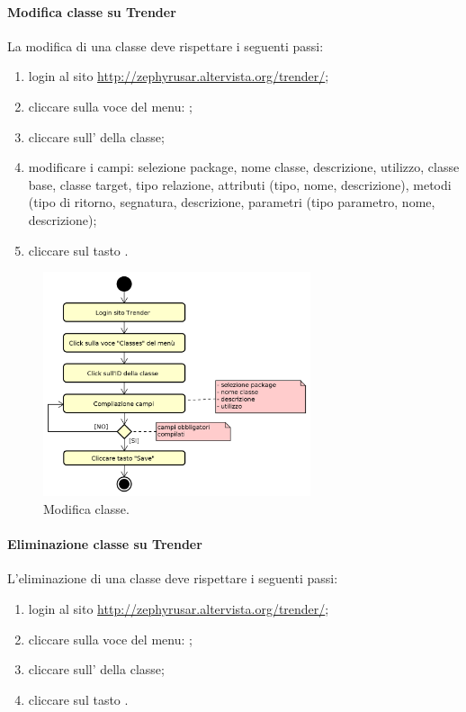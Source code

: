 		\paragraph{Modifica classe su Trender}
		La modifica di una classe deve rispettare i seguenti passi:
		\begin{enumerate}
			\item login al sito \url{http://zephyrusar.altervista.org/trender/};
			\item cliccare sulla voce del menu: ;
			\item cliccare sull' della classe;	
			\item modificare i campi: selezione package, nome classe, descrizione, utilizzo, classe base, classe target, tipo relazione, attributi (tipo, nome, descrizione), metodi (tipo di ritorno, segnatura, descrizione, parametri (tipo parametro, nome, descrizione);
			\item cliccare sul tasto .
		\end{enumerate}
		\begin{figure}[H]
			\centering
			\includegraphics[width=0.7\textwidth]{img/ModificaCl}
			\caption{Modifica classe.}
		\end{figure}
		
		\paragraph{Eliminazione classe su Trender}	
		L'eliminazione di una classe deve rispettare i seguenti passi:
		\begin{enumerate}
			\item login al sito \url{http://zephyrusar.altervista.org/trender/};
			\item cliccare sulla voce del menu: ;
			\item cliccare sull' della classe;
			\item cliccare sul tasto .
		\end{enumerate}
		
